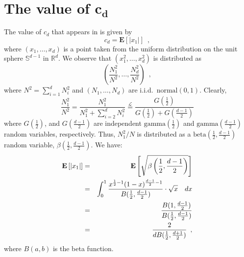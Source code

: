 \documentclass[charterfonts,lotsofwhite]{patmorin}
\newcommand{\E}{\mathbf{E}}
\begin{document}





\appendix
\section{The value of $\mathbf{c_d}$}

The value of $c_d$ that appears in  is given by
\[
  c_d = \E \left[|x_1| \right] \enspace ,
\]
where $(x_1,\ldots,x_d)$ is a point taken from the uniform
distribution on the unit sphere $\mathbb{S}^{d-1}$ in $\mathbb{R}^d$.
We observe that $(x_1^2,\ldots,x_d^2)$ is distributed as 
\[
\left(\frac{N_1^2}{N^2},\ldots,\frac{N_d^2}{N^2}\right) \enspace ,
\]
where $N^2=\sum_{i=1}^d N_i^2$ and $(N_1,\ldots,N_d)$ are i.i.d.\
$\mathrm{normal}(0,1)$.  Clearly,
\[
\frac{N_1^2}{N^2} = \frac{N_1^2}{N_1^2+\sum_{i=2}^dN_i^2}
  \stackrel{\mathcal{L}}{=} \frac{G(\frac{1}{2})}{G(\frac{1}{2})+G(\frac{d-1}{2})}
\]
where $G(\frac{1}{2})$, and $G(\frac{d-1}{2})$ are independent
$\mathrm{gamma}(\frac{1}{2})$ and $\mathrm{gamma}(\frac{d-1}{2})$
random variables, respectively.  Thus, $N_1^2/N$ is distributed as a
$\mathrm{beta}(\frac{1}{2},\frac{d-1}{2})$ random variable,
$\beta(\frac{1}{2},\frac{d-1}{2})$.  We have:
\begin{eqnarray*}
\E\left[|x_1|\right]
 & = & \E\left[\sqrt{\beta\left(\frac{1}{2},\frac{d-1}{2}\right)}\right] \\
 & = & \int_0^1\frac{x^{\frac{1}{2}-1}(1-x)^{\frac{d-1}{2}-1}}
                    {B(\frac{1}{2},\frac{d-1}{2})}\cdot\sqrt{x} \quad dx\\
 & = & \frac{B(1,\frac{d-1}{2})}{B(\frac{1}{2},\frac{d-1}{2})}\\
\comment{ & = & d\cdot 
       \frac{\Gamma(\frac{d-1}{2})}
            {\Gamma(\frac{d+1}{2})} \cdot
       \frac{\Gamma(\frac{d}{2})}
            {\Gamma(\frac{1}{2})\cdot\Gamma(\frac{d-1}{2})} \\
 & = & \frac{d\Gamma(\frac{d}{2})}
            {\Gamma(\frac{1}{2})\cdot\Gamma(\frac{d+1}{2})} \\ 
 & = & \frac{2\Gamma(\frac{d}{2}+1)}
            {\Gamma(\frac{1}{2})\cdot\Gamma(\frac{d+1}{2})} \\
}
 & = & \frac{2}{dB(\frac{1}{2},\frac{d+1}{2})} \enspace , 
\end{eqnarray*}
where $B(a,b)$ is the beta function.
\end{document}
